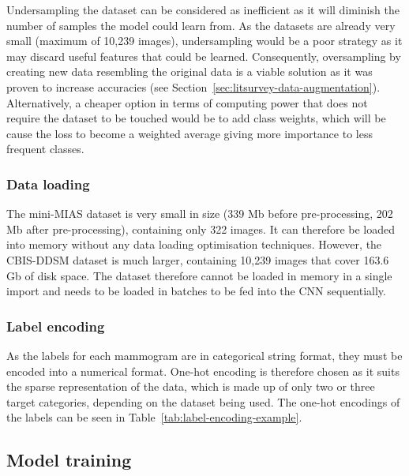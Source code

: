 Undersampling the dataset can be considered as inefficient as it will diminish the number of samples the model could learn from. As the datasets are already very small (maximum of 10,239 images), undersampling would be a poor strategy as it may discard useful features that could be learned. Consequently, oversampling by creating new data resembling the original data is a viable solution as it was proven to increase accuracies (see Section~\ref{sec:litsurvey-data-augmentation}). Alternatively, a cheaper option in terms of computing power that does not require the dataset to be touched would be to add class weights, which will be cause the loss to become a weighted average giving more importance to less frequent classes.

\subsubsection{Data loading}

The mini-MIAS dataset is very small in size (339 Mb before pre-processing, 202 Mb after pre-processing), containing only 322 images. It can therefore be loaded into memory without any data loading optimisation techniques. However, the CBIS-DDSM dataset is much larger, containing 10,239 images that cover 163.6 Gb of disk space. The dataset therefore cannot be loaded in memory in a single import and needs to be loaded in batches to be fed into the CNN sequentially. %

\subsubsection{Label encoding}

As the labels for each mammogram are in categorical string format, they must be encoded into a numerical format. One-hot encoding is therefore chosen as it suits the sparse representation of the data, which is made up of only two or three target categories, depending on the dataset being used. The one-hot encodings of the labels can be seen in Table~\ref{tab:label-encoding-example}.




\subsection{Model training}

